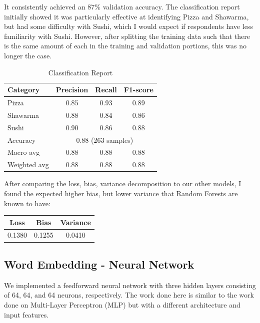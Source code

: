 It consistently achieved an 87\% validation accuracy. The classification report initially showed it was particularly effective at identifying Pizza and Shawarma, but had some difficulty with Sushi, which I would expect if respondents have less familiarity with Sushi. However, after splitting the training data such that there is the same amount of each in the training and validation portions, this was no longer the case.
\begin{table}[ht]
    \centering
    \begin{tabular}{lccc}
        \hline
        Category     & Precision                              & Recall & F1-score \\
        \hline
        Pizza        & 0.85                                   & 0.93   & 0.89     \\
        Shawarma     & 0.88                                   & 0.84   & 0.86     \\
        Sushi        & 0.90                                   & 0.86   & 0.88     \\
        \hline
        Accuracy     & \multicolumn{3}{c}{0.88 (263 samples)}                     \\
        Macro avg    & 0.88                                   & 0.88   & 0.88     \\
        Weighted avg & 0.88                                   & 0.88   & 0.88     \\
        \hline
    \end{tabular}
    \caption{Classification Report}
    \label{tab:classification_report}
\end{table}

After comparing the loss, bias, variance decomposition to our other models, I found the expected higher bias, but lower variance that Random Forests are known to have:
\begin{table}[ht]
    \centering
    \begin{tabular}{ccc}
        \hline
        Loss   & Bias   & Variance \\
        \hline
        0.1380 & 0.1255 & 0.0410   \\
        \hline
    \end{tabular}
    \label{tab:loss_report}
\end{table}

\subsection{Word Embedding - Neural Network}
We implemented a feedforward neural network with three hidden layers consisting of 64, 64, and 64 neurons, respectively. The work done here is similar to the work done on Multi-Layer Perceptron (MLP) but with a different architecture and input features.

